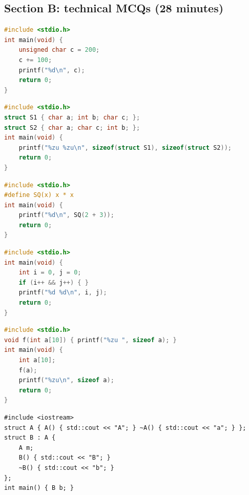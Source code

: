 \documentclass[10pt,a4paper,openany,oneside]{report}
\begin{document}
\subsection*{Section B: technical MCQs (28 minutes)}
\begin{lstlisting}[language={C},basicstyle=\ttfamily\scriptsize]
#include <stdio.h>
int main(void) {
    unsigned char c = 200;
    c += 100;
    printf("%d\n", c);
    return 0;
}
\end{lstlisting}
\begin{lstlisting}[language={C},basicstyle=\ttfamily\scriptsize]
#include <stdio.h>
struct S1 { char a; int b; char c; };
struct S2 { char a; char c; int b; };
int main(void) {
    printf("%zu %zu\n", sizeof(struct S1), sizeof(struct S2));
    return 0;
}
\end{lstlisting}
\begin{lstlisting}[language={C},basicstyle=\ttfamily\scriptsize]
#include <stdio.h>
#define SQ(x) x * x
int main(void) {
    printf("%d\n", SQ(2 + 3));
    return 0;
}
\end{lstlisting}
\begin{lstlisting}[language={C},basicstyle=\ttfamily\scriptsize]
#include <stdio.h>
int main(void) {
    int i = 0, j = 0;
    if (i++ && j++) { }
    printf("%d %d\n", i, j);
    return 0;
}
\end{lstlisting}
\begin{lstlisting}[language={C},basicstyle=\ttfamily\scriptsize]
#include <stdio.h>
void f(int a[10]) { printf("%zu ", sizeof a); }
int main(void) {
    int a[10];
    f(a);
    printf("%zu\n", sizeof a);
    return 0;
}
\end{lstlisting}
\begin{lstlisting}[language={[11]C++},basicstyle=\ttfamily\scriptsize]
#include <iostream>
struct A { A() { std::cout << "A"; } ~A() { std::cout << "a"; } };
struct B : A {
    A m;
    B() { std::cout << "B"; }
    ~B() { std::cout << "b"; }
};
int main() { B b; }
\end{lstlisting}
\end{document}
